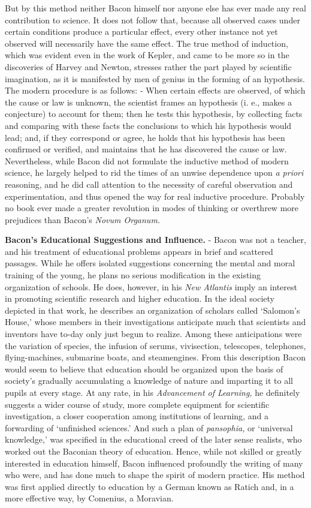 \documentclass[
]{book}
\begin{document}
But by this method neither Bacon himself nor anyone else has ever made any real contribution to science. It does not follow that, because all observed cases under certain conditions produce a particular effect, every other instance not yet observed will necessarily have the same effect. The true method of induction, which was evident even in the work of Kepler, and came to be more so in the discoveries of Harvey and Newton, stresses rather the part played by scientific imagination, as it is manifested by men of genius in the forming of an hypothesis. The modern procedure is as follows: - When certain effects are observed, of which the cause or law is unknown, the scientist frames an hypothesis (i. e., makes a conjecture) to account for them; then he tests this hypothesis, by collecting facts and comparing with these facts the conclusions to which his hypothesis would lead; and, if they correspond or agree, he holds that his hypothesis has been confirmed or verified, and maintains that he has discovered the cause or law. Nevertheless, while Bacon did not formulate the inductive method of modern science, he largely helped to rid the times of an unwise dependence upon \emph{a priori} reasoning, and he did call attention to the necessity of careful observation and experimentation, and thus opened the way for real inductive procedure. Probably no book ever made a greater revolution in modes of thinking or overthrew more prejudices than Bacon's \emph{Novum Organum.}

\textbf{Bacon's Educational Suggestions and Influence.} - Bacon was not a teacher, and his treatment of educational problems appears in brief and scattered passages. While he offers isolated suggestions concerning the mental and moral training of the young, he plans no serious modification in the existing organization of schools. He does, however, in his \emph{New Atlantis} imply an interest in promoting scientific research and higher education. In the ideal society depicted in that work, he describes an organization of scholars called `Salomon's House,' whose members in their investigations anticipate much that scientists and inventors have to-day only just begun to realize. Among these anticipations were the variation of species, the infusion of serums, vivisection, telescopes, telephones, flying-machines, submarine boats, and steamengines. From this description Bacon would seem to believe that education should be organized upon the basis of society's gradually accumulating a knowledge of nature and imparting it to all pupils at every stage. At any rate, in his \emph{Advancement of Learning,} he definitely suggests a wider course of study, more complete equipment for scientific investigation, a closer cooperation among institutions of learning, and a forwarding of `unfinished sciences.' And such a plan of \emph{pansophia,} or `universal knowledge,' was specified in the educational creed of the later sense realists, who worked out the Baconian theory of education. Hence, while not skilled or greatly interested in education himself, Bacon influenced profoundly the writing of many who were, and has done much to shape the spirit of modern practice. His method was first applied directly to education by a German known as Ratich and, in a more effective way, by Comenius, a Moravian.
\end{document}

